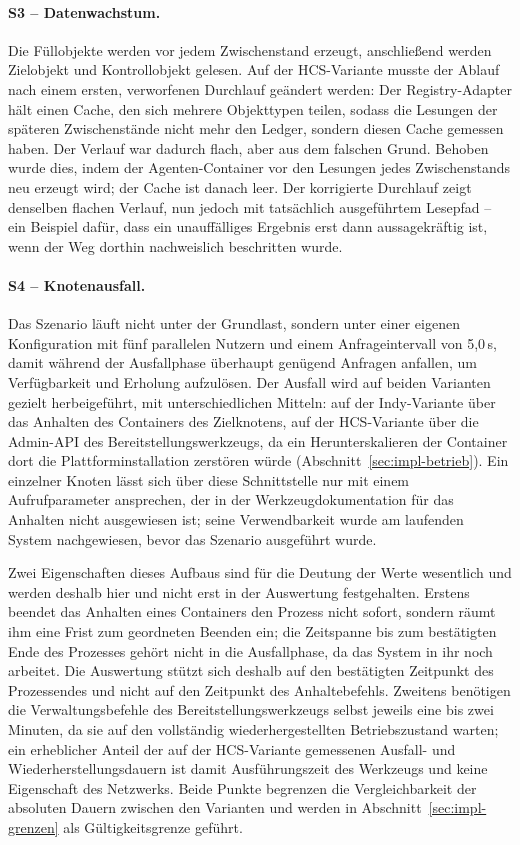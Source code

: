 \paragraph{S3 -- Datenwachstum.} Die Füllobjekte werden vor jedem Zwischenstand erzeugt, anschließend werden Zielobjekt und Kontrollobjekt gelesen. Auf der HCS-Variante musste der Ablauf nach einem ersten, verworfenen Durchlauf geändert werden: Der Registry-Adapter hält einen Cache, den sich mehrere Objekttypen teilen, sodass die Lesungen der späteren Zwischenstände nicht mehr den Ledger, sondern diesen Cache gemessen haben. Der Verlauf war dadurch flach, aber aus dem falschen Grund. Behoben wurde dies, indem der Agenten-Container vor den Lesungen jedes Zwischenstands neu erzeugt wird; der Cache ist danach leer. Der korrigierte Durchlauf zeigt denselben flachen Verlauf, nun jedoch mit tatsächlich ausgeführtem Lesepfad -- ein Beispiel dafür, dass ein unauffälliges Ergebnis erst dann aussagekräftig ist, wenn der Weg dorthin nachweislich beschritten wurde.

\paragraph{S4 -- Knotenausfall.} Das Szenario läuft nicht unter der Grundlast, sondern unter einer eigenen Konfiguration mit fünf parallelen Nutzern und einem Anfrageintervall von 5,0\,s, damit während der Ausfallphase überhaupt genügend Anfragen anfallen, um Verfügbarkeit und Erholung aufzulösen. Der Ausfall wird auf beiden Varianten gezielt herbeigeführt, mit unterschiedlichen Mitteln: auf der Indy-Variante über das Anhalten des Containers des Zielknotens, auf der HCS-Variante über die Admin-API des Bereitstellungswerkzeugs, da ein Herunterskalieren der Container dort die Plattforminstallation zerstören würde (Abschnitt~\ref{sec:impl-betrieb}). Ein einzelner Knoten lässt sich über diese Schnittstelle nur mit einem Aufrufparameter ansprechen, der in der Werkzeugdokumentation für das Anhalten nicht ausgewiesen ist; seine Verwendbarkeit wurde am laufenden System nachgewiesen, bevor das Szenario ausgeführt wurde.

Zwei Eigenschaften dieses Aufbaus sind für die Deutung der Werte wesentlich und werden deshalb hier und nicht erst in der Auswertung festgehalten. Erstens beendet das Anhalten eines Containers den Prozess nicht sofort, sondern räumt ihm eine Frist zum geordneten Beenden ein; die Zeitspanne bis zum bestätigten Ende des Prozesses gehört nicht in die Ausfallphase, da das System in ihr noch arbeitet. Die Auswertung stützt sich deshalb auf den bestätigten Zeitpunkt des Prozessendes und nicht auf den Zeitpunkt des Anhaltebefehls. Zweitens benötigen die Verwaltungsbefehle des Bereitstellungswerkzeugs selbst jeweils eine bis zwei Minuten, da sie auf den vollständig wiederhergestellten Betriebszustand warten; ein erheblicher Anteil der auf der HCS-Variante gemessenen Ausfall- und Wiederherstellungsdauern ist damit Ausführungszeit des Werkzeugs und keine Eigenschaft des Netzwerks. Beide Punkte begrenzen die Vergleichbarkeit der absoluten Dauern zwischen den Varianten und werden in Abschnitt~\ref{sec:impl-grenzen} als Gültigkeitsgrenze geführt.

